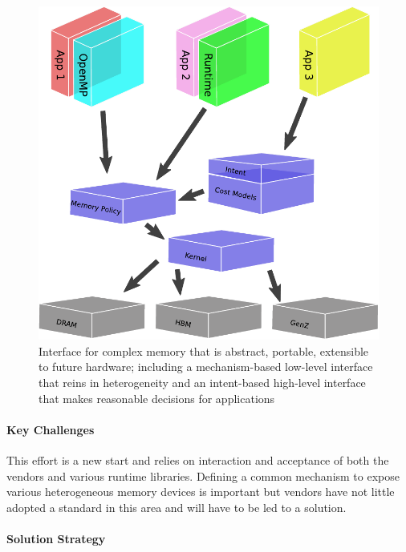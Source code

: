 \begin{figure}
\begin{center}
{
\includegraphics[width=.5\textwidth]{projects/2.3.1-PMR/2.3.1.16-SICM/mike-excelent.pdf}
\caption{Interface for complex memory that is abstract, portable, extensible to future hardware; including a mechanism-based low-level interface that reins in heterogeneity and an intent-based high-level interface that makes reasonable decisions for applications}
}
\end{center}
\end{figure}

\paragraph{Key  Challenges}
This effort is a new start and relies on interaction and acceptance of both the vendors and various runtime libraries. Defining a common mechanism to expose various heterogeneous memory devices is important but vendors have not little adopted a standard in this area and will have to be led to a solution. 

\paragraph{Solution Strategy}

